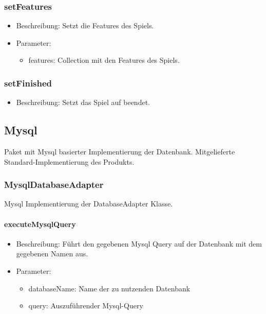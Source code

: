 \documentclass[a4paper]{scrreprt}
\begin{document}
	\subsubsection{setFeatures}
	\begin{itemize}
		\item Beschreibung: Setzt die Features des Spiels.
		\item Parameter:
		\begin{itemize}
			\item features: Collection mit den Features des Spiels.
		\end{itemize}
	\end{itemize}

	\subsubsection{setFinished}
	\begin{itemize}
		\item Beschreibung: Setzt das Spiel auf beendet.
	\end{itemize}
	
	\subsection{Mysql}
	Paket mit Mysql basierter Implementierung der Datenbank.
	Mitgelieferte Standard-Implementierung des Produkts.
	
	\subsubsection{MysqlDatabaseAdapter}
	Mysql Implementierung der DatabaseAdapter Klasse.

	\paragraph{executeMysqlQuery}
	\begin{itemize}
		\item Beschreibung: Führt den gegebenen Mysql Query auf der Datenbank mit dem gegebenen Namen aus.
		\item Parameter:
		\begin{itemize}
			\item databaseName: Name der zu nutzenden Datenbank
			\item query: Auszuführender Mysql-Query
		\end{itemize}
	\end{itemize}
	
\end{document}
